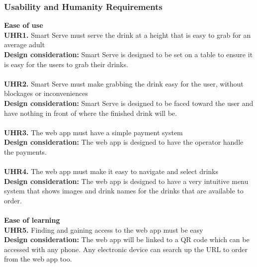 \documentclass[12pt, titlepage]{article}
\begin{document}
\subsubsection{Usability and Humanity Requirements}
    \textbf{Ease of use}\\
        \noindent\textbf{UHR1.} Smart Serve must serve the drink at a height that is easy to grab for an average adult \\
        \indent\textbf{Design consideration:} Smart Serve is designed to be set on a table to ensure it is easy for the users to grab their drinks.\\\\
        \textbf{UHR2.} Smart Serve must make grabbing the drink easy for the user, without blockages or inconveniences\\
        \indent\textbf{Design consideration:} Smart Serve is designed to be faced toward the user and have nothing in front of where the finished drink will be.\\\\
        \textbf{UHR3.} The web app must have a simple payment system\\
        \indent\textbf{Design consideration:} The web app is designed to have the operator handle the payments.\\\\
        \textbf{UHR4.} The web app must make it easy to navigate and select drinks\\
        \indent\textbf{Design consideration:} The web app is designed to have a very intuitive menu system that shows images and drink names for the drinks that are available to order.\\\\
    \textbf{Ease of learning}\\
        \noindent\textbf{UHR5.} Finding and gaining access to the web app must be easy \\
        \indent\textbf{Design consideration:} The web app will be linked to a QR code which can be accessed with any phone. Any electronic device can search up the URL to order from the web app too.
\end{document}
